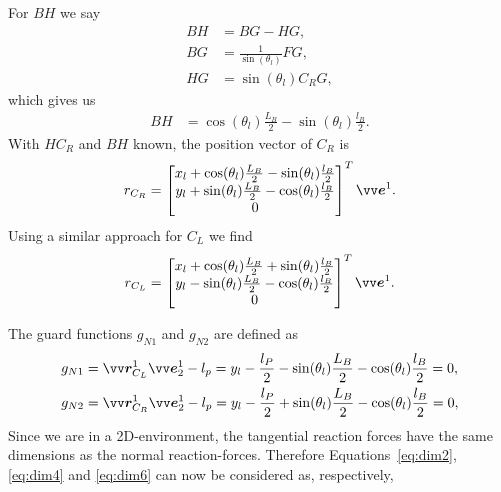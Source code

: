 \documentclass[../DC2017114Bouma.tex]{subfiles}
\begin{document}
For $BH$ we say
\begin{align}
BH &= BG - HG,\\
BG &= \frac{1}{\sin(\theta_l)}FG,\\
HG &= \sin(\theta_l)C_RG,
\end{align}
which gives us 
\begin{align}
BH &= \cos(\theta_l)\frac{L_B}{2} - \sin(\theta_l)\frac{l_B}{2}.
\end{align}
With $HC_R$ and $BH$ known, the position vector of $C_R$ is
\begin{align}
r_{C_R} = \begin{bmatrix}
x_l + \cos(\theta_l)\frac{L_B}{2} - \sin(\theta_l)\frac{l_B}{2}\\
y_l + \sin(\theta_l)\frac{L_B}{2} - \cos(\theta_l)\frac{l_B}{2}\\
0
\end{bmatrix}^T\evec^1.\label{eq:rCR}
\end{align}
Using a similar approach for $C_L$ we find
\begin{align}
r_{C_L} = \begin{bmatrix}
x_l + \cos(\theta_l)\frac{L_B}{2} + \sin(\theta_l)\frac{l_B}{2}\\
y_l - \sin(\theta_l)\frac{L_B}{2} - \cos(\theta_l)\frac{l_B}{2}\\
0
\end{bmatrix}^T\evec^1. \label{eq:rCL}
\end{align}

The guard functions $g_{N1}$ and $g_{N2}$ are defined as
\begin{align}
g_{N1} &= \rvec_{C_L}^1\evec_2^1 - l_p = y_l - \frac{l_P}{2} - \sin(\theta_l)\frac{L_B}{2} - \cos(\theta_l)\frac{l_B}{2} = 0,\\
g_{N2} &= \rvec_{C_R}^1\evec_2^1 - l_p = y_l - \frac{l_P}{2} + \sin(\theta_l)\frac{L_B}{2} - \cos(\theta_l)\frac{l_B}{2} = 0,
\end{align}
Since we are in a 2D-environment, the tangential reaction forces have the same dimensions as the normal reaction-forces. Therefore Equations~\eqref{eq:dim2}, \eqref{eq:dim4} and \eqref{eq:dim6} can now be considered as, respectively,
\end{document}
